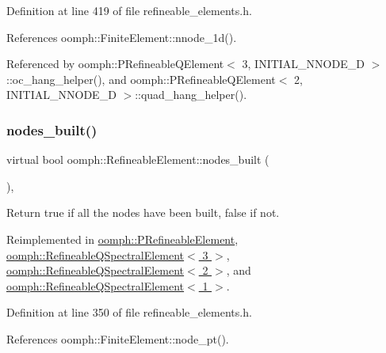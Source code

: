 Definition at line 419 of file refineable\+\_\+elements.\+h.



References oomph\+::\+Finite\+Element\+::nnode\+\_\+1d().



Referenced by oomph\+::\+P\+Refineable\+Q\+Element$<$ 3, I\+N\+I\+T\+I\+A\+L\+\_\+\+N\+N\+O\+D\+E\+\_\+D $>$\+::oc\+\_\+hang\+\_\+helper(), and oomph\+::\+P\+Refineable\+Q\+Element$<$ 2, I\+N\+I\+T\+I\+A\+L\+\_\+\+N\+N\+O\+D\+E\+\_\+D $>$\+::quad\+\_\+hang\+\_\+helper().

\mbox{\label{classoomph_1_1RefineableElement_a50758228db823d72ea8da23dbb000901}} 
\subsubsection{\texorpdfstring{nodes\+\_\+built()}{nodes\_built()}}
{\footnotesize\ttfamily virtual bool oomph\+::\+Refineable\+Element\+::nodes\+\_\+built (\begin{DoxyParamCaption}{ }\end{DoxyParamCaption})\hspace{0.3cm}{\ttfamily [inline]}, {\ttfamily [virtual]}}



Return true if all the nodes have been built, false if not. 



Reimplemented in \hyperlink{classoomph_1_1PRefineableElement_a18a6ec4187845d2dbad763ba284ffcc2}{oomph\+::\+P\+Refineable\+Element}, \hyperlink{classoomph_1_1RefineableQSpectralElement_3_013_01_4_a7e8e8d5ed170fef28820dae9748a1e99}{oomph\+::\+Refineable\+Q\+Spectral\+Element$<$ 3 $>$}, \hyperlink{classoomph_1_1RefineableQSpectralElement_3_012_01_4_a3437e444db1a3d4000ce6c9f73102206}{oomph\+::\+Refineable\+Q\+Spectral\+Element$<$ 2 $>$}, and \hyperlink{classoomph_1_1RefineableQSpectralElement_3_011_01_4_ae80853a6ef35f51a36028619dde94c7a}{oomph\+::\+Refineable\+Q\+Spectral\+Element$<$ 1 $>$}.



Definition at line 350 of file refineable\+\_\+elements.\+h.



References oomph\+::\+Finite\+Element\+::node\+\_\+pt().



